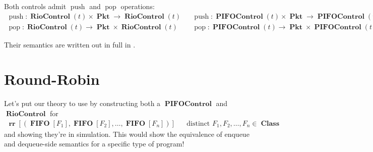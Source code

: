 \documentclass{amsart}
\DeclareMathOperator{\push}{\mathrm{push}}
\DeclareMathOperator{\pop}{\mathrm{pop}}
\DeclareMathOperator{\Pkt}{\mathbf{Pkt}}
\DeclareMathOperator{\RR}{\mathbf{rr}}     %
\DeclareMathOperator{\Class}{\mathbf{Class}}
\DeclareMathOperator{\FIFO}{\mathbf{FIFO}}
\DeclareMathOperator{\PIFOControl}{\mathbf{PIFOControl}}
\DeclareMathOperator{\RioControl}{\mathbf{RioControl}}
\theoremstyle{definition}
\begin{document}
Both controls admit $\push$ and $\pop$ operations:
\begin{align*}
    \push : \RioControl(t) \times \Pkt \to \RioControl(t) && 
    \push : \PIFOControl(t) \times \Pkt \to \PIFOControl(t)\\
    \pop : \RioControl(t) \to \Pkt \times \RioControl(t) && 
    \pop : \PIFOControl(t) \to \Pkt \times \PIFOControl(t)
\end{align*}

Their semantics are written out in full in .

\newpage

\section{Round-Robin}

Let's put our theory to use by constructing both a $\PIFOControl$ and $\RioControl$ for
\begin{align*}
    \RR[(\FIFO[F_1], \FIFO[F_2], \ldots, \FIFO[F_n])] && \text{distinct } F_1, F_2, \ldots, F_n \in \Class
\end{align*}
and showing they're in simulation.
This would show the equivalence of enqueue and dequeue-side semantics for a specific type of program!


\renewcommand\refname{\LARGE References}


\end{document}
